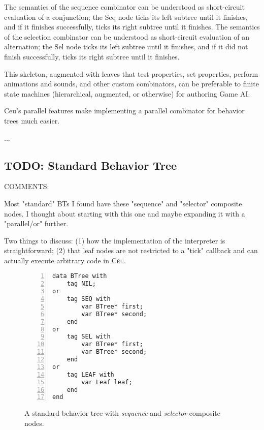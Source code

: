 \documentclass{acm_proc_article-sp}
\newcommand{\CEU}{\textsc{C\'{e}u}\xspace}
\begin{document}
The semantics of the sequence combinator can be understood as short-circuit evaluation of a conjunction;
the Seq node ticks its left subtree until it finishes,
and if it finishes successfully, ticks its right subtree until it finishes.
The semantics of the selection combinator can be understood as short-circuit evaluation of an alternation;
the Sel node ticks its left subtree until it finishes,
and if it did not finish successfully, ticks its right subtree until it finishes.

This skeleton, augmented with leaves that test properties, set properties, perform animations and sounds,
and other custom combinators, can be preferable to finite state machines (hierarchical, augmented, or otherwise) for authoring Game AI.

Ceu's parallel features make implementing a parallel combinator for behavior trees much easier.

...

\subsection{TODO: Standard Behavior Tree}

COMMENTS:

Most "standard" BTs I found have these "sequence" and "selector" composite 
nodes.
I thought about starting with this one and maybe expanding it with a 
"parallel/or" further.

Two things to discuss:
(1) how the implementation of the interpreter is straightforward;
(2) that leaf nodes are not restricted to a "tick" callback and can actually 
execute arbitrary code in \CEU.

\begin{figure}%
\begin{lstlisting}[numbers=left,xleftmargin=3em]
data BTree with
    tag NIL;
or
    tag SEQ with
        var BTree* first;
        var BTree* second;
    end
or
    tag SEL with
        var BTree* first;
        var BTree* second;
    end
or
    tag LEAF with
        var Leaf leaf;
    end
end

\end{lstlisting}
\caption{ A standard behavior tree with \emph{sequence} and \emph{selector}
          composite nodes.
\label{lst.bt1}
}
\end{figure}
\end{document}
